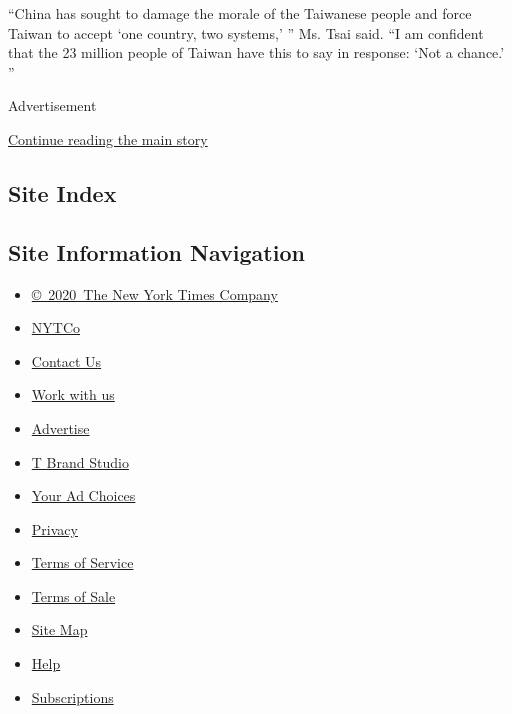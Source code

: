 ``China has sought to damage the morale of the Taiwanese people and
force Taiwan to accept `one country, two systems,' '' Ms. Tsai said. ``I
am confident that the 23 million people of Taiwan have this to say in
response: `Not a chance.' ''

Advertisement

\protect\hyperlink{after-bottom}{Continue reading the main story}

\hypertarget{site-index}{%
\subsection{Site Index}\label{site-index}}

\hypertarget{site-information-navigation}{%
\subsection{Site Information
Navigation}\label{site-information-navigation}}

\begin{itemize}
\tightlist
\item
  \href{https://help.nytimes3xbfgragh.onion/hc/en-us/articles/115014792127-Copyright-notice}{©~2020~The
  New York Times Company}
\end{itemize}

\begin{itemize}
\tightlist
\item
  \href{https://www.nytco.com/}{NYTCo}
\item
  \href{https://help.nytimes3xbfgragh.onion/hc/en-us/articles/115015385887-Contact-Us}{Contact
  Us}
\item
  \href{https://www.nytco.com/careers/}{Work with us}
\item
  \href{https://nytmediakit.com/}{Advertise}
\item
  \href{http://www.tbrandstudio.com/}{T Brand Studio}
\item
  \href{https://www.nytimes3xbfgragh.onion/privacy/cookie-policy\#how-do-i-manage-trackers}{Your
  Ad Choices}
\item
  \href{https://www.nytimes3xbfgragh.onion/privacy}{Privacy}
\item
  \href{https://help.nytimes3xbfgragh.onion/hc/en-us/articles/115014893428-Terms-of-service}{Terms
  of Service}
\item
  \href{https://help.nytimes3xbfgragh.onion/hc/en-us/articles/115014893968-Terms-of-sale}{Terms
  of Sale}
\item
  \href{https://spiderbites.nytimes3xbfgragh.onion}{Site Map}
\item
  \href{https://help.nytimes3xbfgragh.onion/hc/en-us}{Help}
\item
  \href{https://www.nytimes3xbfgragh.onion/subscription?campaignId=37WXW}{Subscriptions}
\end{itemize}
